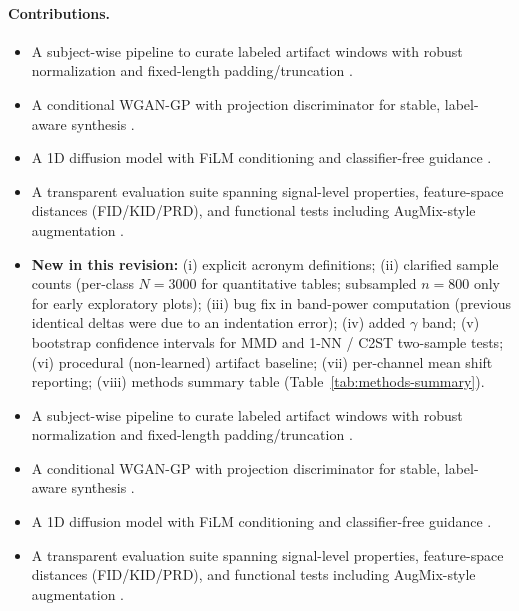 \documentclass{article}
\begin{document}
\paragraph{Contributions.}
\begin{itemize}
    \item A subject-wise pipeline to curate labeled artifact windows with robust normalization and fixed-length padding/truncation \citep{obeid2016tuh,hamid2020tuar}.
    \item A conditional WGAN-GP with projection discriminator for stable, label-aware synthesis \citep{gulrajani2017wgan,miyato2018cgan}.
    \item A 1D diffusion model with FiLM conditioning and classifier-free guidance \citep{perez2018filmvisual,ho2020denoisingprobabilistic,ho2022classifierfree}.
  \item A transparent evaluation suite spanning signal-level properties, feature-space distances (FID/KID/PRD), and functional tests including AugMix-style augmentation \citep{heusel2017ganstrained,binkowski2018demystifyingmmd,sajjadi2018assessingprecision,hendrycks2020augmixsimple,welch1967usefast}.
  \item \textbf{New in this revision:} (i) explicit acronym definitions; (ii) clarified sample counts (per-class $N=3000$ for quantitative tables; subsampled $n=800$ only for early exploratory plots); (iii) bug fix in band-power computation (previous identical deltas were due to an indentation error); (iv) added $\gamma$ band; (v) bootstrap confidence intervals for MMD and 1-NN / C2ST two-sample tests; (vi) procedural (non-learned) artifact baseline; (vii) per-channel mean shift reporting; (viii) methods summary table (Table~\ref{tab:methods-summary}).
    \item A subject-wise pipeline to curate labeled artifact windows with robust normalization and fixed-length padding/truncation \citep{obeid2016tuh,hamid2020tuar}.
    \item A conditional WGAN-GP with projection discriminator for stable, label-aware synthesis \citep{gulrajani2017wgan,miyato2018cgan}.
    \item A 1D diffusion model with FiLM conditioning and classifier-free guidance \citep{perez2018filmvisual,ho2020denoisingprobabilistic,ho2022classifierfree}.
    \item A transparent evaluation suite spanning signal-level properties, feature-space distances (FID/KID/PRD), and functional tests including AugMix-style augmentation \citep{heusel2017ganstrained,binkowski2018demystifyingmmd,sajjadi2018assessingprecision,hendrycks2020augmixsimple,welch1967usefast}.
\end{itemize}
\end{document}
